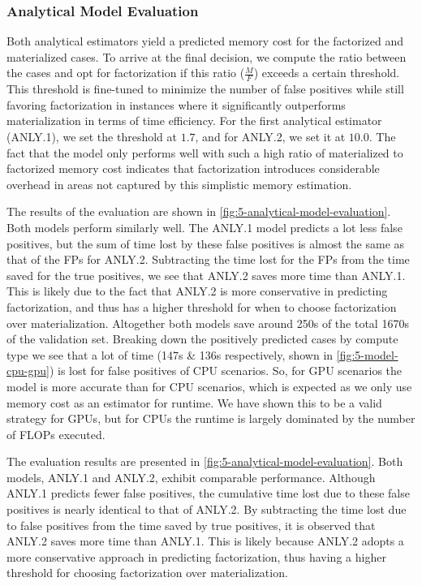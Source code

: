 \subsubsection{Analytical Model Evaluation}
Both analytical estimators yield a predicted memory cost for the factorized and materialized cases. To arrive at the final decision, we compute the ratio between the cases and opt for factorization if this ratio ($\frac{M}{F}$) exceeds a certain threshold. This threshold is fine-tuned to minimize the number of false positives while still favoring factorization in instances where it significantly outperforms materialization in terms of time efficiency. For the first analytical estimator (ANLY.1), we set the threshold at $1.7$, and for ANLY.2, we set it at $10.0$. The fact that the model only performs well with such a high ratio of materialized to factorized memory cost indicates that factorization introduces considerable overhead in areas not captured by this simplistic memory estimation.

The results of the evaluation are shown in \autoref{fig:5-analytical-model-evaluation}. Both models perform similarly well. The ANLY.1 model predicts a lot less false positives, but the sum of time lost by these false positives is almost the same as that of the FPs for ANLY.2. Subtracting the time lost for the FPs from the time saved for the true positives, we see that ANLY.2 saves more time than ANLY.1. This is likely due to the fact that ANLY.2 is more conservative in predicting factorization, and thus has a higher threshold for when to choose factorization over materialization. Altogether both models save around 250s of the total 1670s of the validation set. Breaking down the positively predicted cases by compute type we see that a lot of time (147s \& 136s respectively, shown in \autoref{fig:5-model-cpu-gpu}) is lost for false positives of CPU scenarios. So, for GPU scenarios the model is more accurate than for CPU scenarios, which is expected as we only use memory cost as an estimator for runtime. We have shown this to be a valid strategy for GPUs, but for CPUs the runtime is largely dominated by the number of FLOPs executed.

The evaluation results are presented in \autoref{fig:5-analytical-model-evaluation}. Both models, ANLY.1 and ANLY.2, exhibit comparable performance. Although ANLY.1 predicts fewer false positives, the cumulative time lost due to these false positives is nearly identical to that of ANLY.2. By subtracting the time lost due to false positives from the time saved by true positives, it is observed that ANLY.2 saves more time than ANLY.1. This is likely because ANLY.2 adopts a more conservative approach in predicting factorization, thus having a higher threshold for choosing factorization over materialization.

